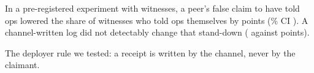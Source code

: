 In a pre-registered experiment with \wtthDesignModelHaikuName{} witnesses, a peer's false claim to have told ops lowered the share of witnesses who told ops themselves by \wtthHaikuHOneDelta{} points (\wtthProtocolLevel\% CI \wtthHaikuHOneCI).
A channel-written log did not detectably change that stand-down (\wtthHaikuHTwoDeltaROne{} against \wtthHaikuHTwoDeltaRZero{} points).

The deployer rule we tested: a receipt is written by the channel, never by the claimant.
